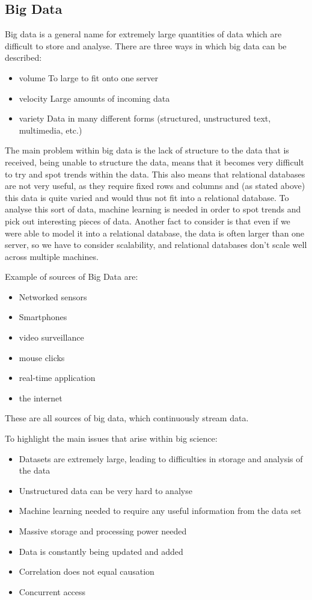 \subsection{Big Data}

Big data is a general name for extremely large quantities of data which are difficult to store and analyse. There are three ways in which big data can be described:
\begin{itemize}
	\item volume
		\subitem To large to fit onto one server
	\item velocity
		\subitem Large amounts of incoming data
	\item variety
		\subitem Data in many different forms (structured, unstructured text, multimedia, etc.)
\end{itemize}

The main problem within big data is the lack of structure to the data that is received, being unable to structure the data, means that it becomes very difficult to try and spot trends within the data. This also means that relational databases are not very useful, as they require fixed rows and columns and (as stated above) this data is quite varied and would thus not fit into a relational database. To analyse this sort of data, machine learning is needed in order to spot trends and pick out interesting pieces of data. Another fact to consider is that even if we were able to model it into a relational database, the data is often larger than one server, so we have to consider scalability, and relational databases don't scale well across multiple machines.

Example of sources of Big Data are:
\begin{itemize}
	\item Networked sensors
	\item Smartphones
	\item video surveillance
	\item mouse clicks
	\item real-time application
	\item the internet
\end{itemize}
These are all sources of big data, which continuously stream data.

To highlight the main issues that arise within big science:
\begin{itemize}
	\item Datasets are extremely large, leading to difficulties in storage and analysis of the data
	\item Unstructured data can be very hard to analyse
	\item Machine learning needed to require any useful information from the data set
	\item Massive storage and processing power needed
	\item Data is constantly being updated and added
	\item Correlation does not equal causation
	\item Concurrent access
\end{itemize}

